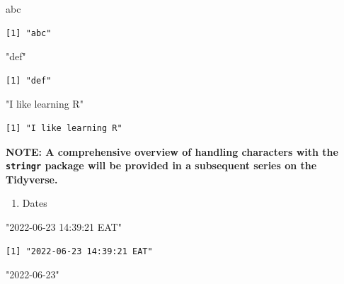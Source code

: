 \documentclass[
  letterpaper,
  DIV=11,
  numbers=noendperiod]{scrreprt}
\newenvironment{Shaded}{\begin{snugshade}}{\end{snugshade}}
\newcommand{\StringTok}[1]{\textcolor[rgb]{0.13,0.47,0.30}{#1}}
\providecommand{\tightlist}{%
  \setlength{\itemsep}{0pt}\setlength{\parskip}{0pt}}\usepackage{longtable,booktabs,array}
\begin{document}
\begin{Shaded}
\begin{Highlighting}[]
\StringTok{\textquotesingle{}abc\textquotesingle{}}
\end{Highlighting}
\end{Shaded}

\begin{verbatim}
[1] "abc"
\end{verbatim}

\begin{Shaded}
\begin{Highlighting}[]
\StringTok{"def"}
\end{Highlighting}
\end{Shaded}

\begin{verbatim}
[1] "def"
\end{verbatim}

\begin{Shaded}
\begin{Highlighting}[]
\StringTok{"I like learning R"}
\end{Highlighting}
\end{Shaded}

\begin{verbatim}
[1] "I like learning R"
\end{verbatim}

\textbf{NOTE: A comprehensive overview of handling characters with the
\texttt{stringr} package will be provided in a subsequent series on the
Tidyverse.}

\begin{enumerate}
\def\labelenumi{\arabic{enumi}.}
\setcounter{enumi}{5}
\tightlist
\item
  Dates
\end{enumerate}

\begin{Shaded}
\begin{Highlighting}[]
\StringTok{"2022{-}06{-}23 14:39:21 EAT"}
\end{Highlighting}
\end{Shaded}

\begin{verbatim}
[1] "2022-06-23 14:39:21 EAT"
\end{verbatim}

\begin{Shaded}
\begin{Highlighting}[]
\StringTok{"2022{-}06{-}23"}
\end{Highlighting}
\end{Shaded}
\end{document}

